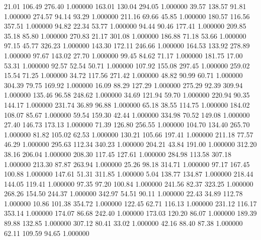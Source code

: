      21.01    106.49    276.40  1.000000
    163.01    130.04    294.05  1.000000
     39.57    138.57     91.81  1.000000
    274.57     94.14     93.29  1.000000
    211.16     69.66     45.85  1.000000
    180.57    116.56    357.51  1.000000
     94.82     22.34     53.77  1.000000
     94.44     90.46    177.41  1.000000
    209.85     35.18     85.80  1.000000
    270.83     21.17    301.08  1.000000
    186.88     71.18     53.66  1.000000
     97.15     45.77    326.23  1.000000
    143.30    172.11    246.66  1.000000
    164.53    133.92    278.89  1.000000
     97.67    143.02     27.70  1.000000
     99.45     84.62     71.17  1.000000
    181.75     17.00     53.31  1.000000
     92.57     52.54     50.71  1.000000
    107.92    155.08    297.45  1.000000
    259.02     15.54     71.25  1.000000
     34.72    117.56    271.42  1.000000
     48.82     90.99     60.71  1.000000
    304.39     79.75    169.92  1.000000
     16.09     88.29    127.29  1.000000
    275.29     92.39    309.94  1.000000
    135.46     96.58    248.62  1.000000
     34.69    121.94     59.70  1.000000
    220.94     90.35    144.17  1.000000
    231.74     36.89     96.88  1.000000
     65.18     38.55    114.75  1.000000
    184.02    108.07     85.67  1.000000
     59.54    159.30     42.44  1.000000
    334.98     70.52    149.08  1.000000
     27.40    146.73    173.13  1.000000
     71.39    126.80    256.55  1.000000
    104.70    134.40    265.70  1.000000
     81.82    105.02     62.53  1.000000
    130.21    105.66    197.41  1.000000
    211.18     77.57     46.29  1.000000
    295.63    112.34    340.23  1.000000
    204.21     43.84    191.00  1.000000
    312.20     38.16    206.04  1.000000
    208.30    117.45    127.61  1.000000
    284.98    113.58    307.18  1.000000
    213.30     87.87    263.94  1.000000
     25.26     98.18    314.71  1.000000
     97.17    167.45    100.88  1.000000
    147.61     51.31    311.85  1.000000
      5.04    138.77    134.87  1.000000
    218.44    144.05    119.41  1.000000
     97.35     97.20    100.84  1.000000
    241.56     82.37    323.25  1.000000
    268.26    154.50    244.37  1.000000
    342.97     54.51     90.11  1.000000
     22.43     34.89    112.78  1.000000
     10.86    101.38    354.72  1.000000
    122.45     62.71    116.13  1.000000
    231.12    116.17    353.14  1.000000
    174.07     86.68    242.40  1.000000
    173.03    120.20     86.07  1.000000
    189.39     89.88    132.85  1.000000
    307.12     80.41     33.02  1.000000
     42.16     88.40     87.38  1.000000
     62.11    109.59     94.65  1.000000
